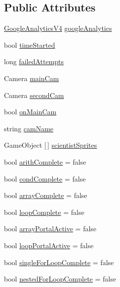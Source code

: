 \subsection*{Public Attributes}
\begin{DoxyCompactItemize}
\item 
\hyperlink{class_google_analytics_v4}{Google\+Analytics\+V4} \hyperlink{class_global_controller_a07eab03323734ee3d6bb98fbcd74631d}{google\+Analytics}
\item 
bool \hyperlink{class_global_controller_a2ba8216c6a7ce8c86fac9109f862f987}{time\+Started}
\item 
long \hyperlink{class_global_controller_a62c9cd6f677068c5ee01ee2d111dc1e0}{failed\+Attempts}
\item 
Camera \hyperlink{class_global_controller_a5306f034de74eb967dcb2ac69f65dc1b}{main\+Cam}
\item 
Camera \hyperlink{class_global_controller_a5a49301b40b343a34455602a61352f38}{second\+Cam}
\item 
bool \hyperlink{class_global_controller_a38a9c134634e25115dbaabe0599402c5}{on\+Main\+Cam}
\item 
string \hyperlink{class_global_controller_a9d3bd43867859b70cddd42139c588884}{cam\+Name}
\item 
Game\+Object \mbox{[}$\,$\mbox{]} \hyperlink{class_global_controller_a562bed7b82ef0ae6b84ef6bbc061fcd2}{scientist\+Sprites}
\item 
bool \hyperlink{class_global_controller_adb1a210e3781f70338fb7e41bbf27bf5}{arith\+Complete} = false
\item 
bool \hyperlink{class_global_controller_ae764fa91d71200973cd4f29027e75882}{cond\+Complete} = false
\item 
bool \hyperlink{class_global_controller_a5a822475cde64a740d5e956841f3f30c}{array\+Complete} = false
\item 
bool \hyperlink{class_global_controller_a3d0e1daed25e43680a859ef959ff415d}{loop\+Complete} = false
\item 
bool \hyperlink{class_global_controller_acfa3a6cc5d553935d62ddff74958a738}{array\+Portal\+Active} = false
\item 
bool \hyperlink{class_global_controller_adfcf0fc37bcbdcec0ad7bbe73a1a3f29}{loop\+Portal\+Active} = false
\item 
bool \hyperlink{class_global_controller_a3a46793d2eb2610e6271ea910fb7e233}{single\+For\+Loop\+Complete} = false
\item 
bool \hyperlink{class_global_controller_a132d355ddde6363fddae3bc4f85b2678}{nested\+For\+Loop\+Complete} = false

\end{DoxyCompactItemize}
